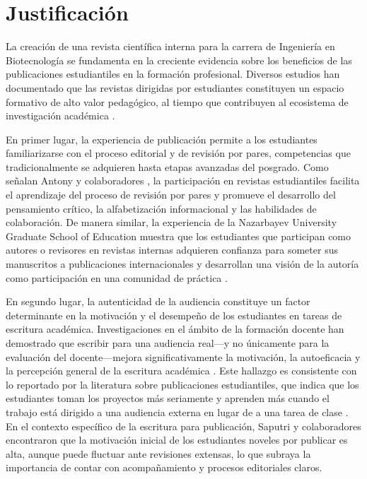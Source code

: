 \chapter{Justificación}

La creación de una revista científica interna para la carrera de Ingeniería en Biotecnología se fundamenta en la creciente evidencia sobre los beneficios de las publicaciones estudiantiles en la formación profesional. Diversos estudios han documentado que las revistas dirigidas por estudiantes constituyen un espacio formativo de alto valor pedagógico, al tiempo que contribuyen al ecosistema de investigación académica \citep{warren2025vital}.

En primer lugar, la experiencia de publicación permite a los estudiantes familiarizarse con el proceso editorial y de revisión por pares, competencias que tradicionalmente se adquieren hasta etapas avanzadas del posgrado. Como señalan Antony y colaboradores \citep{antony2025facilitating}, la participación en revistas estudiantiles facilita el aprendizaje del proceso de revisión por pares y promueve el desarrollo del pensamiento crítico, la alfabetización informacional y las habilidades de colaboración. De manera similar, la experiencia de la Nazarbayev University Graduate School of Education muestra que los estudiantes que participan como autores o revisores en revistas internas adquieren confianza para someter sus manuscritos a publicaciones internacionales y desarrollan una visión de la autoría como participación en una comunidad de práctica \citep{drybrough2025eight}.

En segundo lugar, la autenticidad de la audiencia constituye un factor determinante en la motivación y el desempeño de los estudiantes en tareas de escritura académica. Investigaciones en el ámbito de la formación docente han demostrado que escribir para una audiencia real—y no únicamente para la evaluación del docente—mejora significativamente la motivación, la autoeficacia y la percepción general de la escritura académica \citep{banegas2020learning}. Este hallazgo es consistente con lo reportado por la literatura sobre publicaciones estudiantiles, que indica que los estudiantes toman los proyectos más seriamente y aprenden más cuando el trabajo está dirigido a una audiencia externa en lugar de a una tarea de clase \citep{uaa2014undergraduate}. En el contexto específico de la escritura para publicación, Saputri y colaboradores \citep{saputri2023students} encontraron que la motivación inicial de los estudiantes noveles por publicar es alta, aunque puede fluctuar ante revisiones extensas, lo que subraya la importancia de contar con acompañamiento y procesos editoriales claros.

